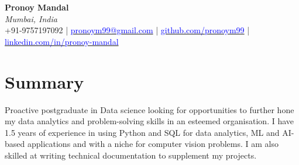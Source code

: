 \documentclass[a4paper,11pt]{article}
\makeatletter
\newcommand{\name}{Pronoy Mandal} %
\newcommand{\course}{Masters of Technology} %
\newcommand{\phone}{9757197092} %
\newcommand{\emaila}{pronoym99@gmail.com} %
\newcommand{\github}{https://github.com/pronoym99/} %
\newcommand{\linkedin}{https://www.linkedin.com/in/pronoy-mandal/} %
\makeatother
\begin{document}
\selectfont


\begin{center}
\textbf{\Huge \name} \\
\textit{Mumbai, India} \\
+91-9757197092 | \href{mailto:\emaila}{\textcolor{blue}{pronoym99@gmail.com}} | \href{https://github.com/\github}{\textcolor{blue}{github.com/pronoym99}} | \href{https://www.linkedin.com/in/\linkedin/}{\textcolor{blue}{linkedin.com/in/pronoy-mandal}}

\end{center}


  

\vspace{-2mm}
\section{\textbf{Summary}}

Proactive postgraduate in Data science looking for opportunities to further hone my data analytics and problem-solving skills in an esteemed organisation. I have 1.5 years of experience in using Python and SQL for data analytics, ML and AI-based applications and with a niche for computer vision problems. I am also skilled at writing technical documentation to supplement my projects.
\end{document}
